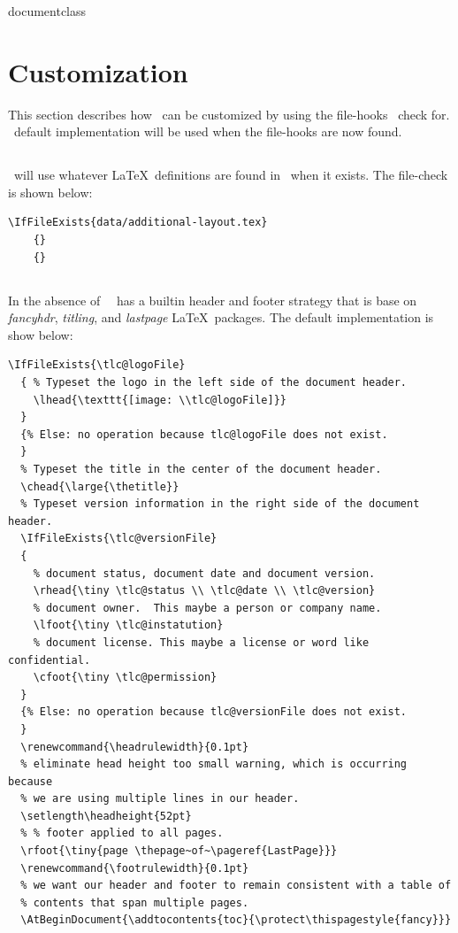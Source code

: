 documentclass\documentclass[12pt]{tlc-article}
\begin{document}

\clearpage
\section{Customization}
This section describes how \tlcA\ can be customized by using the file-hooks
\tlcA\ check for.  \tlcA\ default implementation will be used when the
file-hooks are now found.


\subsection{\tlcAL}
\tlcA\ will use whatever \LaTeX\ definitions are found in \tlcAL\ when it
exists.  The file-check is shown
below:

\begin{lstlisting}[basicstyle=\tiny]
  \IfFileExists{data/additional-layout.tex}
    {}
    {}
\end{lstlisting}


\subsection{\tlcHF}
In the absence of \tlcAL\, \tlcA\ has a builtin header and footer strategy that
is base on \textit{fancyhdr}, \textit{titling}, and \textit{lastpage} \LaTeX\
packages. The default implementation is show below:

\begin{lstlisting}[basicstyle=\tiny]
  \IfFileExists{\tlc@logoFile}
  { % Typeset the logo in the left side of the document header.
    \lhead{\texttt{[image: \\tlc@logoFile]}}
  }
  {% Else: no operation because tlc@logoFile does not exist.
  }
  % Typeset the title in the center of the document header.
  \chead{\large{\thetitle}}
  % Typeset version information in the right side of the document header.
  \IfFileExists{\tlc@versionFile}
  {
    % document status, document date and document version.
    \rhead{\tiny \tlc@status \\ \tlc@date \\ \tlc@version}
    % document owner.  This maybe a person or company name.
    \lfoot{\tiny \tlc@instatution}
    % document license. This maybe a license or word like confidential.
    \cfoot{\tiny \tlc@permission}
  }
  {% Else: no operation because tlc@versionFile does not exist.
  }
  \renewcommand{\headrulewidth}{0.1pt}
  % eliminate head height too small warning, which is occurring because
  % we are using multiple lines in our header.
  \setlength\headheight{52pt}
  % % footer applied to all pages.
  \rfoot{\tiny{page \thepage~of~\pageref{LastPage}}}
  \renewcommand{\footrulewidth}{0.1pt}
  % we want our header and footer to remain consistent with a table of
  % contents that span multiple pages.
  \AtBeginDocument{\addtocontents{toc}{\protect\thispagestyle{fancy}}}
\end{lstlisting}
\end{document}

